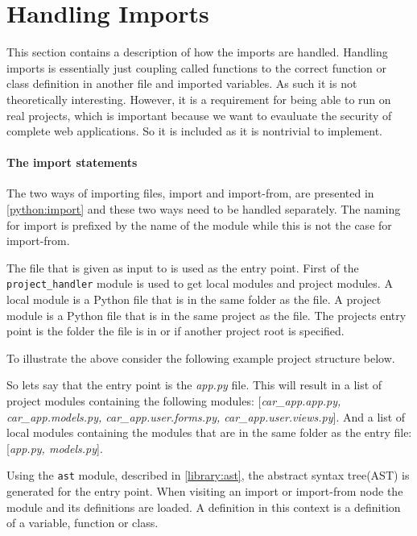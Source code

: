 \section{Handling Imports}
This section contains a description of how the imports are handled.
Handling imports is essentially just coupling called functions to the correct function or class definition in another file and imported variables.
As such it is not theoretically interesting.
However, it is a requirement for being able to run \pyt{} on real projects, which is important because we want to evauluate the security of complete web applications.
So it is included as it is nontrivial to implement.

\paragraph{The import statements}
The two ways of importing files, import and import-from, are presented in \cref{python:import} and these two ways need to be handled separately.
The naming for import is prefixed by the name of the module while this is not the case for import-from.


The file that is given as input to \pyt{} is used as the entry point.
First of the \texttt{project\_handler} module is used to get local modules and project modules.
A local module is a Python file that is in the same folder as the file.
A project module is a Python file that is in the same project as the file.
The projects entry point is the folder the file is in or if another project root is specified.

To illustrate the above consider the following example project structure below.


So lets say that the entry point is the \textit{app.py} file.
This will result in a list of project modules containing the following modules: [\textit{car\_app.app.py, car\_app.models.py, car\_app.user.forms.py, car\_app.user.views.py}].
And a list of local modules containing the modules that are in the same folder as the entry file: [\textit{app.py, models.py}].


Using the \texttt{ast} module, described in \cref{library:ast}, the abstract syntax tree(AST) is generated for the entry point.
When visiting an import or import-from node the module and its definitions are loaded.
A definition in this context is a definition of a variable, function or class.

